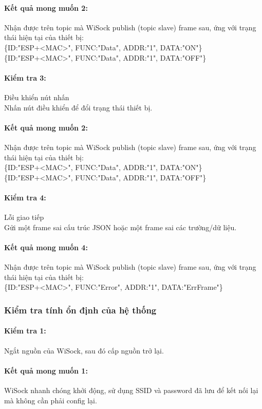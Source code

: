 \documentclass[a4paper]{article}
\begin{document}
\paragraph*{Kết quả mong muốn 2:}
Nhận được trên topic mà WiSock publish (topic slave) frame sau, ứng với trạng thái hiện tại của thiết bị:\\
\{ID:"ESP+<MAC>", FUNC:"Data", ADDR:"1", DATA:"ON"\}\\
\{ID:"ESP+<MAC>", FUNC:"Data", ADDR:"1", DATA:"OFF"\}\\
\paragraph*{Kiểm tra 3:} Điều khiển nút nhấn\\
Nhấn nút điều khiển để đổi trạng thái thiết bị.
\paragraph*{Kết quả mong muốn 2:}
Nhận được trên topic mà WiSock publish (topic slave) frame sau, ứng với trạng thái hiện tại của thiết bị:\\
\{ID:"ESP+<MAC>", FUNC:"Data", ADDR:"1", DATA:"ON"\}\\
\{ID:"ESP+<MAC>", FUNC:"Data", ADDR:"1", DATA:"OFF"\}\\
\paragraph*{Kiểm tra 4:} Lỗi giao tiếp\\
Gửi một frame sai cấu trúc JSON hoặc một frame sai các trường/dữ liệu.
\paragraph*{Kết quả mong muốn 4:}
Nhận được trên topic mà WiSock publish (topic slave) frame sau, ứng với trạng thái hiện tại của thiết bị:\\
\{ID:"ESP+<MAC>", FUNC:"Error", ADDR:"1", DATA:"ErrFrame"\}\\
\subsubsection{Kiểm tra tính ổn định của hệ thống}
\paragraph*{Kiểm tra 1:} Ngắt nguồn của WiSock, sau đó cấp nguồn trở lại.
\paragraph*{Kết quả mong muốn 1:} WiSock nhanh chóng khởi động, sử dụng SSID và password đã lưu để kết nối lại mà không cần phải config lại.\\
\end{document}
